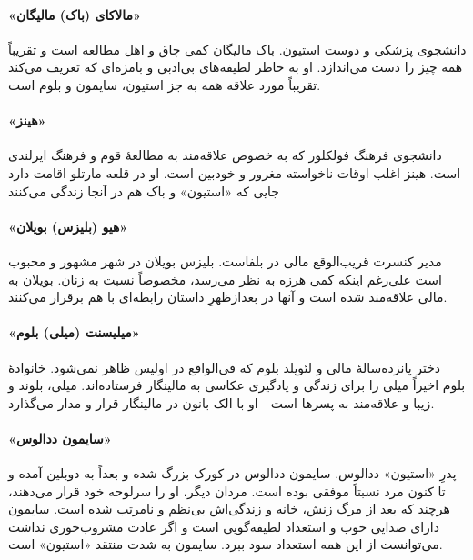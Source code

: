 \documentclass[12pt]{book}
\newcommand{\noun}[1]{«{#1}»}
\begin{document}
    \paragraph{\noun{مالاکای (باک)  مالیگان}\protect{}}
    دانشجوی پزشکی و دوست استیون. باک مالیگان کمی چاق و اهل مطالعه است و تقریباً همه چیز را دست می‌اندازد. او به خاطر لطیفه‌های بی‌ادبی و بامزه‌ای که تعریف می‌کند تقریباً مورد علاقه همه به جز استیون، سایمون و بلوم است.
    \paragraph{\noun{هینز}\protect{}}
    دانشجوی فرهنگ فولکلور که به خصوص علاقه‌مند به مطالعۀ قوم و فرهنگ ایرلندی است. هینز اغلب اوقات ناخواسته مغرور و خودبین است. او در قلعه مارتلو اقامت دارد جایی که \noun{استیون} و باک هم در آنجا زندگی می‌کنند
    \paragraph{\noun{هیو (بلیزس) بویلان}\protect{}}
    مدیر کنسرت قریب‌الوقع مالی در بلفاست. بلیزس بویلان در شهر مشهور و محبوب است علی‌رغم اینکه کمی هرزه به نظر می‌رسد، مخصوصاً نسبت به زنان. بویلان به مالی علاقه‌مند شده است و آنها در بعدازظهرِ داستان رابطه‌ای با هم برقرار می‌کنند.
    \paragraph{\noun{میلیسنت (میلی) بلوم}\protect{}}
    دختر پانزده‌سالۀ مالی و لئوپلد بلوم که فی‌الواقع در اولیس ظاهر نمی‌شود. خانوادۀ بلوم اخیراً میلی را برای زندگی و یادگیری عکاسی به مالینگار فرستاده‌اند. میلی، بلوند و زیبا و علاقه‌مند به پسرها است - او با الک بانون در مالینگار قرار و مدار می‌گذارد.
    \paragraph{\noun{سایمون ددالوس}\protect{}}
    پدرِ \noun{استیون} ددالوس. سایمون ددالوس در کورک بزرگ شده و بعداً به دوبلین آمده و تا کنون مرد نسبتاً موفقی بوده است. مردان دیگر، او را سرلوحه خود قرار می‌دهند، هرچند که بعد از مرگ زنش، خانه و زندگی‌اش بی‌نظم و نامرتب شده است. سایمون دارای صدایی خوب و استعداد لطیفه‌گویی است و اگر عادت مشروب‌خوری نداشت می‌توانست از این همه استعداد سود ببرد. سایمون به شدت منتقد \noun{استیون} است.
\end{document}
